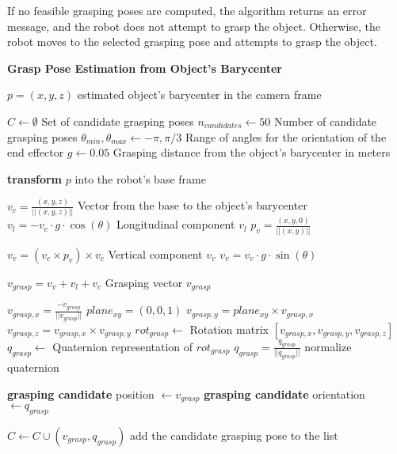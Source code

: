 If no feasible grasping poses are computed, the algorithm returns an error message, and the robot does not attempt
to grasp the object. Otherwise, the robot moves to the selected grasping pose and attempts to grasp the object.

\begin{algorithm}[H]
    \caption{\textbf{Grasp Pose Estimation from Object's Barycenter}}
    \label{alg:grasping}
    \begin{algorithmic}[1]
    \Require $p = (x, y, z)$ estimated object's barycenter in the camera frame

    \State $C \gets \emptyset$ \Comment Set of candidate grasping poses
    \State $n_{candidates} \gets 50$ \Comment Number of candidate grasping poses
    \State $\theta_{min}, \theta_{max} \gets -\pi, \pi/3$ \Comment Range of angles for the orientation of the end effector
    \State $g \gets 0.05$ \Comment Grasping distance from the object's barycenter in meters

    \State \textbf{transform} $p$ into the robot's base frame

        \State $v_{c} = \frac{(x,y,z)}{||(x,y,z)||}$ \Comment Vector from the base to the object's barycenter
        \State $v_{l} = -v_{c} \cdot g \cdot \cos(\theta)$ \Comment Longitudinal component $v_l$
        \State $p_v = \frac{(x, y, 0)}{||(x,y)||}$ 

        \State $v_v = (v_c \times p_v) \times v_c$ \Comment Vertical component $v_v$
        \State $v_v = v_v \cdot g \cdot \sin(\theta)$
        
        \State $v_{grasp} = v_v + v_l + v_c$ \Comment Grasping vector $v_{grasp}$
        
        \State $v_{grasp, x} = \frac{-v_{grasp}}{||v_{grasp}||}$ 
        \State $plane_{xy} = (0, 0, 1)$ 
        \State $v_{grasp, y} = plane_{xy} \times v_{grasp, x}$
        \State $v_{grasp, z} = v_{grasp, x} \times v_{grasp, y}$
        \State $rot_{grasp} \gets$ Rotation matrix $\left[v_{grasp, x}, v_{grasp, y}, v_{grasp, z}\right]$
        \State $q_{grasp} \gets$ Quaternion representation of $rot_{grasp}$
        \State $q_{grasp} = \frac{q_{grasp}}{||q_{grasp}||} $   \Comment normalize quaternion
        
        \State \textbf{grasping candidate} position $\gets v_{grasp}$
        \State \textbf{grasping candidate} orientation $\gets q_{grasp}$

            \State $C \gets C \cup (v_{grasp}, q_{grasp})$ \Comment add the candidate grasping pose to the list
        \EndIf
    \EndFor


\end{algorithmic}
\end{algorithm}
